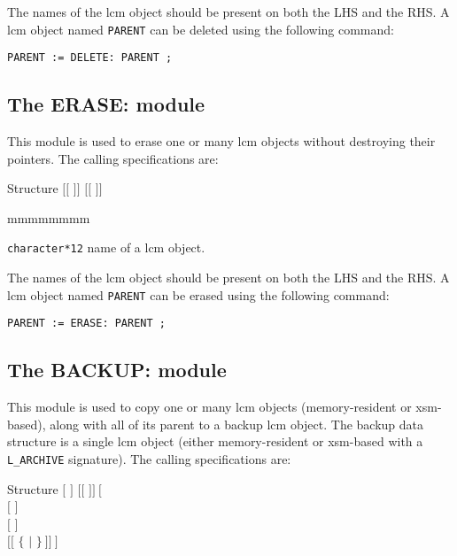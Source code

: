 The names of the {\sc lcm} object should be present on both the LHS and
the RHS. A {\sc lcm} object named {\tt PARENT} can be deleted using the following command:

\begin{verbatim}
PARENT := DELETE: PARENT ;
\end{verbatim}

\subsection{The ERASE: module}\label{sect:ERASEData}

This module is used to erase one or many {\sc lcm} objects without destroying their pointers. The calling
specifications are:

\begin{DataStructure}{Structure }
$[[$  $]]$ \moc{:=}  $[[$  $]]$ \moc{;}
\end{DataStructure}

\begin{ListeDeDescription}{mmmmmmmm}

\item[\dusa{NAME1}] {\tt character*12} name of a {\sc lcm} object.

\end{ListeDeDescription}

The names of the {\sc lcm} object should be present on both the LHS and
the RHS. A {\sc lcm} object named {\tt PARENT} can be erased using the following command:

\begin{verbatim}
PARENT := ERASE: PARENT ;
\end{verbatim}

\clearpage

\subsection{The BACKUP: module}\label{sect:BACKUPData}

This module is used to copy one or many {\sc lcm} objects (memory-resident or {\sc xsm}-based), along with all of its parent to a backup {\sc lcm} object. The backup data
structure is a single {\sc lcm} object (either memory-resident or {\sc xsm}-based with a {\tt L\_ARCHIVE} signature). The calling specifications are:

\begin{DataStructure}{Structure }
 \moc{:=}  $[$  $]$ $[[$  $]]~[$ \moc{::} \\
 $[$   $]$ \\
 $[$   $]$ \\
 $[[$  $\{$   $|$   $\}~]]~]$ \moc{;}
\end{DataStructure}

